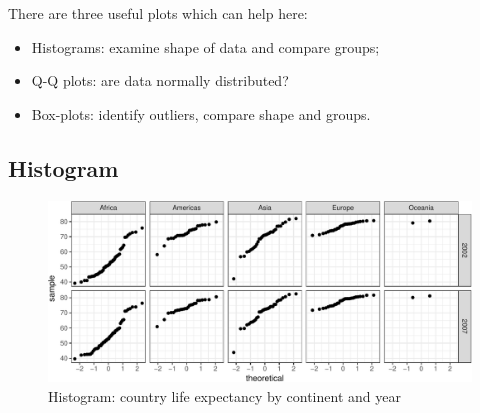 \documentclass[12pt,]{krantz}
\makeatletter
\newenvironment{Shaded}{\begin{snugshade}}{\end{snugshade}}
\newcommand{\CommentTok}[1]{\textcolor[rgb]{0.56,0.35,0.01}{\textit{#1}}}
\newcommand{\DataTypeTok}[1]{\textcolor[rgb]{0.13,0.29,0.53}{#1}}
\newcommand{\DecValTok}[1]{\textcolor[rgb]{0.00,0.00,0.81}{#1}}
\newcommand{\KeywordTok}[1]{\textcolor[rgb]{0.13,0.29,0.53}{\textbf{#1}}}
\newcommand{\NormalTok}[1]{#1}
\newcommand{\OperatorTok}[1]{\textcolor[rgb]{0.81,0.36,0.00}{\textbf{#1}}}
\newcommand{\StringTok}[1]{\textcolor[rgb]{0.31,0.60,0.02}{#1}}
\providecommand{\tightlist}{%
  \setlength{\itemsep}{0pt}\setlength{\parskip}{0pt}}
\newenvironment{kframe}{%
\medskip{}
\setlength{\fboxsep}{.8em}
 \def\at@end@of@kframe{}%
 \ifinner\ifhmode%
  \def\at@end@of@kframe{\end{minipage}}%
  \begin{minipage}{\columnwidth}%
 \fi\fi%
 \def\FrameCommand##1{\hskip\@totalleftmargin \hskip-\fboxsep
 \colorbox{shadecolor}{##1}\hskip-\fboxsep
     \hskip-\linewidth \hskip-\@totalleftmargin \hskip\columnwidth}%
 \MakeFramed {\advance\hsize-\width
   \@totalleftmargin\z@ \linewidth\hsize
   \@setminipage}}%
 {\par\unskip\endMakeFramed%
 \at@end@of@kframe}
\renewenvironment{Shaded}{\begin{kframe}}{\end{kframe}}
\theoremstyle{definition}
\theoremstyle{definition}
\theoremstyle{definition}
\theoremstyle{remark}
\makeatother
\begin{document}
There are three useful plots which can help here:

\begin{itemize}
\tightlist
\item
  Histograms: examine shape of data and compare groups;
\item
  Q-Q plots: are data normally distributed?
\item
  Box-plots: identify outliers, compare shape and groups.
\end{itemize}

\hypertarget{histogram}{%
\subsection{Histogram}\label{histogram}}

\begin{Shaded}
\end{Shaded}

\begin{figure}
\centering
\includegraphics{06_tests_continuous_files/figure-latex/unnamed-chunk-4-1.pdf}
\caption{\label{fig:unnamed-chunk-4}Histogram: country life expectancy by
continent and year}
\end{figure}
\end{document}
